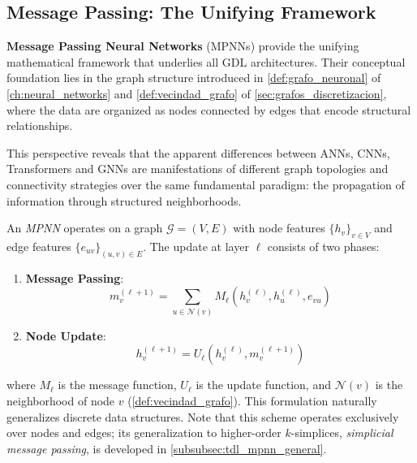 \subsection{Message Passing: The Unifying Framework}\label{subsec:message_passing_unificador}

\textbf{Message Passing Neural Networks} (\glspl{MPNN}) provide the unifying mathematical framework that underlies all \gls{GDL} architectures. Their conceptual foundation lies in the graph structure introduced in \autoref{def:grafo_neuronal} of \autoref{ch:neural_networks} and \autoref{def:vecindad_grafo} of \autoref{sec:grafos_discretizacion}, where the data are organized as nodes connected by edges that encode structural relationships.

This perspective reveals that the apparent differences between \glspl{ANN}, \glspl{CNN}, \glspl{Transformer} and \glspl{GNN} are manifestations of different graph topologies and connectivity strategies over the same fundamental paradigm: the propagation of information through structured neighborhoods.

\begin{definition}\label{def:mpnn_unificador}
An \textit{\gls{MPNN}} operates on a graph $\mathcal{G} = (V, E)$ with node features $\{h_v\}_{v \in V}$ and edge features $\{e_{uv}\}_{(u,v) \in E}$. The update at layer $\ell$ consists of two phases:

\begin{enumerate}
    \item \textbf{Message Passing}:
    \begin{equation}
    m_v^{(\ell+1)} = \sum_{u \in \mathcal{N}(v)} M_\ell(h_v^{(\ell)}, h_u^{(\ell)}, e_{vu})
    \end{equation}
      \item \textbf{Node Update}:
    \begin{equation}
    h_v^{(\ell+1)} = U_\ell(h_v^{(\ell)}, m_v^{(\ell+1)})
    \end{equation}
\end{enumerate}

where $M_\ell$ is the message function, $U_\ell$ is the update function, and $\mathcal{N}(v)$ is the neighborhood of node $v$ (\autoref{def:vecindad_grafo}). This formulation naturally generalizes discrete data structures. Note that this scheme operates exclusively over nodes and edges; its generalization to higher-order $k$-simplices, \textit{simplicial message passing}, is developed in \autoref{subsubsec:tdl_mpnn_general}.
\end{definition}

